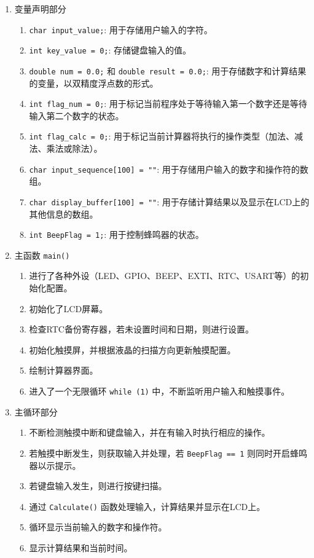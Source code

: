 \documentclass{course-thesis/theme-2639013-final}
\begin{document}
\begin{enumerate}
  \item 变量声明部分
    \begin{enumerate}
      \item \texttt{char input\_value;}: 用于存储用户输入的字符。
      \item \texttt{int key\_value = 0;}: 存储键盘输入的值。
      \item \texttt{double num = 0.0;} 和 \texttt{double result = 0.0;}: 用于存储数字和计算结果的变量，以双精度浮点数的形式。
      \item \texttt{int flag\_num = 0;}: 用于标记当前程序处于等待输入第一个数字还是等待输入第二个数字的状态。
      \item \texttt{int flag\_calc = 0;}: 用于标记当前计算器将执行的操作类型（加法、减法、乘法或除法）。
      \item \texttt{char input\_sequence[100] = ""}: 用于存储用户输入的数字和操作符的数组。
      \item \texttt{char display\_buffer[100] = ""}: 用于存储计算结果以及显示在LCD上的其他信息的数组。
      \item \texttt{int BeepFlag = 1;}: 用于控制蜂鸣器的状态。
    \end{enumerate}

  \item 主函数 \texttt{main()}
    \begin{enumerate}
      \item 进行了各种外设（LED、GPIO、BEEP、EXTI、RTC、USART等）的初始化配置。
      \item 初始化了LCD屏幕。
      \item 检查RTC备份寄存器，若未设置时间和日期，则进行设置。
      \item 初始化触摸屏，并根据液晶的扫描方向更新触摸配置。
      \item 绘制计算器界面。
      \item 进入了一个无限循环 \texttt{while (1)} 中，不断监听用户输入和触摸事件。
    \end{enumerate}

  \item 主循环部分
    \begin{enumerate}
      \item 不断检测触摸中断和键盘输入，并在有输入时执行相应的操作。
      \item 若触摸中断发生，则获取输入并处理，若 \texttt{BeepFlag == 1} 则同时开启蜂鸣器以示提示。
      \item 若键盘输入发生，则进行按键扫描。
      \item 通过 \texttt{Calculate()} 函数处理输入，计算结果并显示在LCD上。
      \item 循环显示当前输入的数字和操作符。
      \item 显示计算结果和当前时间。
    \end{enumerate}
\end{enumerate}
\end{document}
